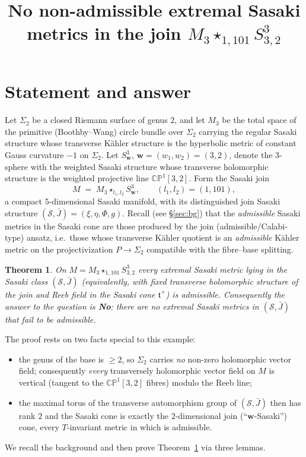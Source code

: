 \documentclass{amsart}
\newtheorem{theorem}{Theorem}
\theoremstyle{definition}
\begin{document}
\title{No non-admissible extremal Sasaki metrics in the join
$M_3\star_{1,101}S^3_{3,2}$}
\maketitle

\section{Statement and answer}

Let $\Sigma_2$ be a closed Riemann surface of genus $2$, and let $M_3$ be the
total space of the primitive (Boothby--Wang) circle bundle over $\Sigma_2$
carrying the regular Sasaki structure whose transverse K\"ahler structure is
the hyperbolic metric of constant Gauss curvature $-1$ on $\Sigma_2$. Let
$S^3_{\mathbf w}$, $\mathbf w=(w_1,w_2)=(3,2)$, denote the $3$-sphere with the
weighted Sasaki structure whose transverse holomorphic structure is the
weighted projective line $\mathbb{CP}^1[3,2]$. Form the Sasaki join
\begin{equation}\label{eq:join}
  M \;=\; M_3 \star_{l_1,l_2} S^3_{\mathbf w},\qquad
  (l_1,l_2)=(1,101),
\end{equation}
a compact $5$-dimensional Sasaki manifold, with its distinguished join Sasaki
structure $(\mathcal S,\bar J)=(\xi,\eta,\Phi,g)$. Recall (see \S\ref{sec:bg})
that the \emph{admissible} Sasaki metrics in the Sasaki cone are those produced
by the join (admissible/Calabi-type) ansatz, i.e.\ those whose transverse
K\"ahler quotient is an \emph{admissible} K\"ahler metric on the
projectivization $P\to\Sigma_2$ compatible with the fibre--base splitting.

\begin{theorem}\label{thm:main}
On $M=M_3\star_{1,101}S^3_{3,2}$ \emph{every} extremal Sasaki metric lying in
the Sasaki class $(\mathcal S,\bar J)$ (equivalently, with fixed transverse
holomorphic structure of the join and Reeb field in the Sasaki cone
$\mathfrak t^+$) is admissible. Consequently the answer to the question is
\textbf{No}: there are no extremal Sasaki metrics in $(\mathcal S,\bar J)$ that
fail to be admissible.
\end{theorem}

The proof rests on two facts special to this example:
\begin{itemize}
\item[(A)] the genus of the base is $\ge 2$, so $\Sigma_2$ carries
\emph{no} non-zero holomorphic vector field; consequently \emph{every}
transversely holomorphic vector field on $M$ is vertical (tangent to the
$\mathbb{CP}^1[3,2]$ fibres) modulo the Reeb line;
\item[(B)] the maximal torus of the transverse automorphism group of
$(\mathcal S,\bar J)$ then has rank $2$ and the Sasaki cone is exactly the
$2$-dimensional join (``$\mathbf w$-Sasaki'') cone, every $T$-invariant
metric in which is admissible.
\end{itemize}
We recall the background and then prove Theorem~\ref{thm:main} via three lemmas.
\end{document}
